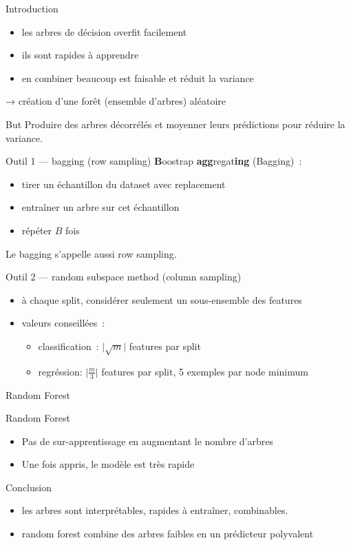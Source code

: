 \begin{frame}{Introduction}
  \begin{itemize}
  \item les arbres de décision overfit facilement
  \item ils sont rapides à apprendre
  \item en combiner beaucoup est faisable et réduit la variance
  \end{itemize}
  → création d'une forêt (ensemble d'arbres) aléatoire
\end{frame}

\begin{frame}{But}
  Produire des arbres décorrélés et moyenner leurs prédictions pour
  réduire la variance.
\end{frame}

\begin{frame}{Outil 1 — bagging (row sampling)}
  \textbf{B}oostrap \textbf{agg}regat\textbf{ing} (Bagging) :
  \begin{itemize}
  \item tirer un échantillon du dataset avec replacement
  \item entraîner un arbre sur cet échantillon
  \item répéter $B$ fois
  \end{itemize}
  Le bagging s'appelle aussi row sampling.
\end{frame}

\begin{frame}{Outil 2 — random subspace method (column sampling)}
  \begin{itemize}
  \item à chaque split, considérer seulement un sous-ensemble des
    features
  \item valeurs conseillées :
    \begin{itemize}
    \item classification : $\lvert\sqrt m\rvert$ features par split
    \item regréssion: $\lvert\frac{m}{3}\rvert$ features par split, 5
      exemples par node minimum
    \end{itemize}
  \end{itemize}
\end{frame}

\begin{frame}{Random Forest}
\end{frame}

\begin{frame}{Random Forest}
  \begin{itemize}
  \item Pas de sur-apprentissage en augmentant le nombre d'arbres
  \item Une fois appris, le modèle est très rapide
  \end{itemize}
\end{frame}

\begin{frame}{Conclusion}
  \begin{itemize}
  \item les arbres sont interprétables, rapides à entraîner,
    combinables.
  \item random forest combine des arbres faibles en un prédicteur
    polyvalent
  \end{itemize}
\end{frame}
